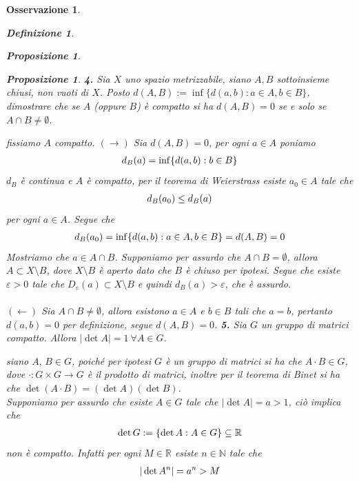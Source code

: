 \documentclass[oneside, 11pt]{amsbook}
\makeatletter
\newcommand{\0}{{(0)}}
\newcommand{\3}{{(3)}}
\theoremstyle{colonplain}
\newtheorem{prop}[thm]{Proposizione}
\theoremstyle{colondefinition}
\newtheorem{defn}[thm]{Definizione}
\theoremstyle{colonremark}
\newtheorem{rmk}[thm]{Osservazione}
\numberwithin{equation}{chapter}
\renewcommand{\proofname}{Dimostrazione}
\renewenvironment{proof}[1][\proofname]{\par
  \pushQED{\end{proof}}%
  \normalfont \topsep6\p@\@plus6\p@\relax
  \trivlist
  \item[\hskip\labelsep\bfseries #1:]\ignorespaces
}{%
  \popQED\endtrivlist\@endpefalse
}
\makeatother
\begin{document}
\begin{rmk}
\begin{defn}
\begin{prop}
\begin{prop}
\begin{proof}[Soluzione]
\end{proof}
\textbf{4.} Sia $X$ uno spazio metrizzabile, siano $A, B$ sottoinsieme chiusi, non vuoti di $X$. Posto $d(A, B) := \inf \{ d(a, b) : a \in A, b \in B \}$, dimostrare che se $A$ (oppure $B$) è compatto si ha $d(A,B) = 0$ se e solo se $A \cap B \neq \emptyset$.
\begin{proof}[Soluzione]
fissiamo $A$ compatto. $(\rightarrow)$ Sia $d(A, B) = 0$, per ogni $a \in A$ poniamo
\begin{align}
    d_B(a) = \inf \{ d(a, b) : b \in B \} \notag
\end{align}
$d_B$ è continua e $A$ è compatto, per il \textit{teorema di Weierstrass} esiste $a_0 \in A$ tale che 
\begin{align}
    d_B(a_0) \leq d_B(a) \notag
\end{align}
per ogni $a \in A$. Segue che 
\begin{align}
    d_B(a_0) = \inf\{d(a, b) : a \in A, b \in B\} = d(A, B) = 0 \notag
\end{align}
Mostriamo che $a \in A \cap B$. Supponiamo per assurdo che $A \cap B = \emptyset$, allora $A \subset X \setminus B$, dove $X \setminus B$ è aperto dato che $B$ è chiuso per ipotesi. Segue che esiste $\varepsilon > 0$ tale che $D_\varepsilon(a) \subset X \setminus B$ e quindi $d_B(a) > \varepsilon$, che è assurdo. \\ \\
$(\leftarrow)$ Sia $A \cap B \neq \emptyset$, allora esistono $a \in A$ e $b \in B$ tali che $a = b$, pertanto $d(a, b) = 0$ per definizione, segue $d(A, B) = 0$.
\end{proof}
\textbf{5.} Sia $G$ un gruppo di matrici compatto. Allora $|\det A| = 1 \ \forall A \in G$.
\begin{proof}[Soluzione]
siano $A,\, B \in G$, poiché per ipotesi $G$ è un gruppo di matrici si ha che $A \cdot B \in G$, dove $\cdot : G \times G \longrightarrow G$ è il prodotto di matrici, inoltre per il teorema di Binet si ha che $\det (A \cdot B) = (\det A)(\det B)$. \\
Supponiamo per assurdo che esiste $A \in G$ tale che $|\det A| = a > 1$, ciò implica che
\begin{align}
    \det G := \{ \det A : A \in G \} \subseteq \mathbb{R} \notag
\end{align}
non è compatto. Infatti per ogni $M \in \mathbb{R}$ esiste $n \in \mathbb{N}$ tale che
\begin{align}
    |\det A^n| = a^n > M \notag
\end{align}

\end{proof}
\end{prop}
\end{prop}
\end{defn}
\end{rmk}
\end{document}
